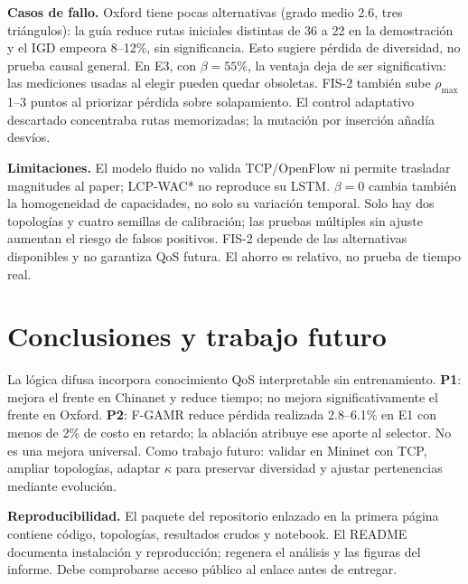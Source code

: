 \documentclass[conference]{IEEEtran}
\begin{document}
\textbf{Casos de fallo.} Oxford tiene pocas alternativas (grado medio 2.6, tres triángulos): la guía reduce rutas iniciales distintas de 36 a 22 en la demostración y el IGD empeora 8--12\%, sin significancia. Esto sugiere pérdida de diversidad, no prueba causal general. En E3, con $\beta=55\%$, la ventaja deja de ser significativa: las mediciones usadas al elegir pueden quedar obsoletas. FIS-2 también sube $\rho_{\max}$ 1--3 puntos al priorizar pérdida sobre solapamiento. El control adaptativo descartado concentraba rutas memorizadas; la mutación por inserción añadía desvíos.

\textbf{Limitaciones.} El modelo fluido no valida TCP/OpenFlow ni permite trasladar magnitudes al paper; LCP-WAC* no reproduce su LSTM. $\beta=0$ cambia también la homogeneidad de capacidades, no solo su variación temporal. Solo hay dos topologías y cuatro semillas de calibración; las pruebas múltiples sin ajuste aumentan el riesgo de falsos positivos. FIS-2 depende de las alternativas disponibles y no garantiza QoS futura. El ahorro es relativo, no prueba de tiempo real.

\section{Conclusiones y trabajo futuro}
La lógica difusa incorpora conocimiento QoS interpretable sin entrenamiento. \textbf{P1}: mejora el frente en Chinanet y reduce tiempo; no mejora significativamente el frente en Oxford. \textbf{P2}: F-GAMR reduce pérdida realizada 2.8--6.1\% en E1 con menos de 2\% de costo en retardo; la ablación atribuye ese aporte al selector. No es una mejora universal. Como trabajo futuro: validar en Mininet con TCP, ampliar topologías, adaptar $\kappa$ para preservar diversidad y ajustar pertenencias mediante evolución.

\textbf{Reproducibilidad.} El paquete del repositorio enlazado en la primera página contiene código, topologías, resultados crudos y notebook. El README documenta instalación y reproducción;  regenera el análisis y  las figuras del informe. Debe comprobarse acceso público al enlace antes de entregar.



\end{document}
